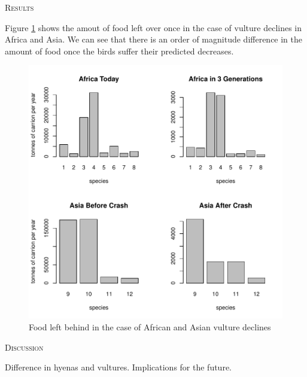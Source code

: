 \documentclass[12pt,letterpaper]{article}
\renewcommand{\section}[1]{%
\bigskip
\begin{center}
\begin{Large}
\normalfont\scshape #1
\medskip
\end{Large}
\end{center}}
\begin{document}
%
%


\section{Results}


Figure \ref{Vultures Asia and Africa food} shows the amout of food left over once in the case of vulture declines in Africa and Asia. We can see that there is an order of magnitude difference in the amount of food once the birds suffer their predicted decreases. 

\begin{figure}[H]
\centering
    \includegraphics[keepaspectratio,totalheight=0.7\textheight]{VultureFood.pdf}
\caption{Food left behind in the case of African and Asian vulture declines}
\label{Vultures Asia and Africa food}
\end{figure}

%
%

\section{Discussion}
Difference in hyenas and vultures. Implications for the future. 
\end{document}
